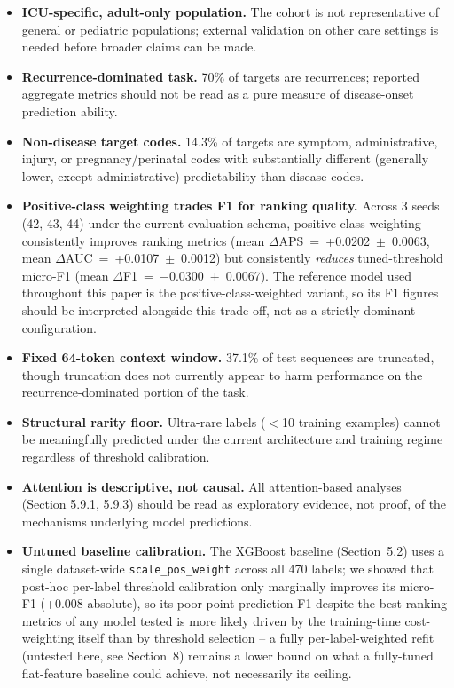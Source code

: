 \documentclass[11pt]{article}
\begin{document}
\begin{itemize}
  \item \textbf{ICU-specific, adult-only population.} The cohort is not
    representative of general or pediatric populations; external validation
    on other care settings is needed before broader claims can be made.
  \item \textbf{Recurrence-dominated task.} 70\% of targets are recurrences;
    reported aggregate metrics should not be read as a pure measure of
    disease-onset prediction ability.
  \item \textbf{Non-disease target codes.} 14.3\% of targets are symptom,
    administrative, injury, or pregnancy/perinatal codes with substantially
    different (generally lower, except administrative) predictability than
    disease codes.
  \item \textbf{Positive-class weighting trades F1 for ranking quality.}
    Across 3 seeds (42, 43, 44) under the current evaluation schema,
    positive-class weighting consistently improves ranking metrics (mean
    $\Delta$APS~=~+0.0202~$\pm$~0.0063, mean $\Delta$AUC~=~+0.0107~$\pm$~0.0012)
    but consistently \emph{reduces} tuned-threshold micro-F1 (mean
    $\Delta$F1~=~$-$0.0300~$\pm$~0.0067). The reference model used throughout
    this paper is the positive-class-weighted variant, so its F1 figures
    should be interpreted alongside this trade-off, not as a strictly
    dominant configuration.
  \item \textbf{Fixed 64-token context window.} 37.1\% of test sequences are
    truncated, though truncation does not currently appear to harm
    performance on the recurrence-dominated portion of the task.
  \item \textbf{Structural rarity floor.} Ultra-rare labels ($<$10 training
    examples) cannot be meaningfully predicted under the current
    architecture and training regime regardless of threshold calibration.
  \item \textbf{Attention is descriptive, not causal.} All attention-based
    analyses (Section 5.9.1, 5.9.3) should be read as exploratory evidence,
    not proof, of the mechanisms underlying model predictions.
  \item \textbf{Untuned baseline calibration.} The XGBoost baseline
    (Section~5.2) uses a single dataset-wide \texttt{scale\_pos\_weight}
    across all 470 labels; we showed that post-hoc per-label threshold
    calibration only marginally improves its micro-F1 (+0.008 absolute),
    so its poor point-prediction F1 despite the best ranking metrics of any
    model tested is more likely driven by the training-time cost-weighting
    itself than by threshold selection -- a fully per-label-weighted refit
    (untested here, see Section~8) remains a lower bound on what a
    fully-tuned flat-feature baseline could achieve, not necessarily its
    ceiling.
\end{itemize}
\end{document}

